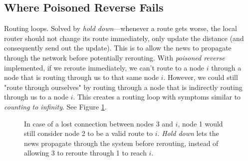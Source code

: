 \documentclass[10pt,a4paper]{article}
\begin{document}
\subsection{Where Poisoned Reverse Fails}
Routing loops. Solved by \emph{hold down}\cite{tcpip}---whenever a route gets worse, the local router should not change its route immediately, only update the distance (and consequently send out the update). This is to allow the news to propagate through the network before potentially rerouting. With \emph{poisoned reverse} implemented, if we reroute immediately, we can't route to a node $i$ through a node that is routing through us to that same node $i$. However, we could still "route through ourselves" by routing through a node that is indirectly routing through us to a node $i$. This creates a routing loop with symptoms similar to \emph{counting to infinity}. See Figure \ref{pic1}.

\begin{figure}[h]
  \centering
  \caption{In case of a lost connection between nodes 3 and $i$, node 1 would still consider node 2 to be a valid route to $i$. \emph{Hold down} lets the news propagate through the system before rerouting, instead of allowing 3 to reroute through 1 to reach $i$.}
  \label{pic1}
\end{figure}




\end{document}
